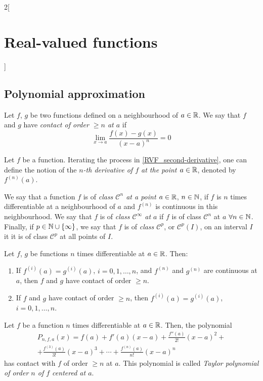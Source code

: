 \documentclass[../../../main.tex]{subfiles}
\begin{document}
\begin{multicols}{2}[\section{Real-valued functions}]
  \subsection{Polynomial approximation}
  \begin{definition}
    Let $f$, $g$ be two functions defined on a neighbourhood of $a\in\mathbb{R}$.  We say that $f$ and $g$ have \emph{contact of order $\geq n$ at $a$} if $$\lim_{x\to a}\frac{f(x)-g(x)}{{(x-a)}^n}=0$$
  \end{definition}
  \begin{definition}
    Let $f$ be a function. Iterating the process in \cref{RVF_second-derivative}, one can define the notion of the \emph{$n$-th derivative of $f$ at the point $a\in\mathbb{R}$}, denoted by $f^{(n)}(a)$.
  \end{definition}
  \begin{definition}
    We say that a function $f$ is of \emph{class $\mathcal{C}^n$ at a point $a\in\mathbb{R}$}, $n\in\mathbb{N}$, if $f$ is $n$ times differentiable at a neighbourhood of $a$ and $f^{(n)}$ is continuous in this neighbourhood. We say that $f$ is of \emph{class $\mathcal{C}^\infty$ at $a$} if $f$ is of class $\mathcal{C}^n$ at $a$ $\forall n\in\mathbb{N}$. Finally, if $p\in\mathbb{N}\cup\{\infty\}$, we say that $f$ is of \emph{class $\mathcal{C}^p$}, or $\mathcal{C}^p(I)$, on an interval $I$ it it is of class $\mathcal{C}^p$ at all points of $I$.
  \end{definition}
  \begin{lemma}
    Let $f$, $g$ be functions $n$ times differentiable at $a\in\mathbb{R}$. Then:
    \begin{enumerate}
      \item If $f^{(i)}(a)=g^{(i)}(a)$, $i=0,1,\ldots,n$, and $f^{(n)}$ and $g^{(n)}$ are continuous at $a$, then $f$ and $g$ have contact of order $\geq n$.
      \item If $f$ and $g$ have contact of order $\geq n$, then $f^{(i)}(a)=g^{(i)}(a)$, $i=0,1,\ldots,n$.
    \end{enumerate}
  \end{lemma}
  \begin{theorem}
    Let $f$ be a function $n$ times differentiable at $a\in\mathbb{R}$. Then, the polynomial
    \begin{multline*}
      P_{n,f,a}(x)=f(a)+f'(a)(x-a)+\frac{f''(a)}{2!}{(x-a)}^2+\\+\frac{f^{(3)}(a)}{3!}{(x-a)}^3+\cdots+\frac{f^{(n)}(a)}{n!}{(x-a)}^n
    \end{multline*}
    has contact with $f$ of order $\geq n$ at $a$. This polynomial is called \emph{Taylor polynomial of order $n$ of $f$ centered at $a$}.

\end{theorem}
\end{multicols}
\end{document}
